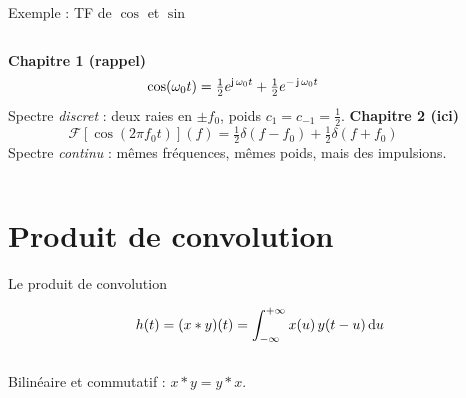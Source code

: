 \documentclass[aspectratio=43,10pt]{beamer}
\newcommand{\highlight}[1]{{\color{niceblue}\emph{#1}}}
\newcommand{\slidefig}[2]{%
\begin{center}
\resizebox{#1}{!}{}
\end{center}
}
\begin{document}
\begin{frame}{Exemple : TF de $\cos$ et $\sin$}
    \begin{columns}
        \small
        \textbf{Chapitre 1 (rappel)}
        \[
            \cos(\omega_0t) = \tfrac12e^{\operatorname{\mathsf{j}}\omega_0t} + \tfrac12e^{-\operatorname{\mathsf{j}}\omega_0t}
        \]
        Spectre \highlight{discret} : deux raies en $\pm f_0$, poids
        $c_1=c_{-1}=\frac12$.
        \small
        \textbf{Chapitre 2 (ici)}
        \[
            \mathcal F[\cos(2\pi f_0t)](f) = \tfrac12\delta(f-f_0) + \tfrac12\delta(f+f_0)
        \]
        Spectre \highlight{continu} : mêmes fréquences, mêmes poids,
        mais des impulsions.
    \end{columns}
    \slidefig{0.75\textwidth}{cos-sin-tf-spectrum.tex}
\end{frame}

\section{Produit de convolution}

\begin{frame}{Le produit de convolution}
    \begin{definition}
        $$
            h(t) = (x*y)(t) = \int_{-\infty}^{+\infty} x(u)\,y(t-u)\,{\rm d} u
        $$
    \end{definition}
    \begin{columns}
        \slidefig{\textwidth}{conv-setup.tex}
        \slidefig{\textwidth}{conv-product.tex}
    \end{columns}
    \begin{center}
        \small Bilinéaire et commutatif : $x*y=y*x$.
    \end{center}
\end{frame}
\end{document}
